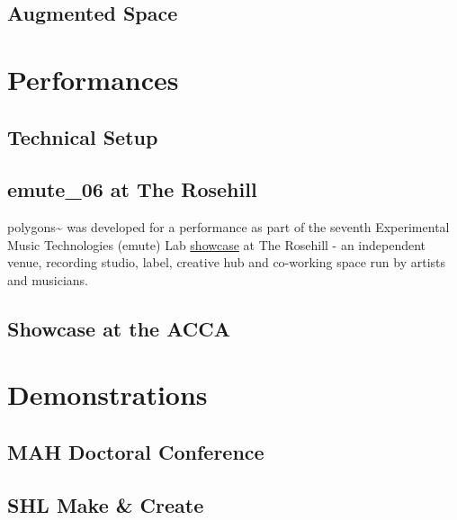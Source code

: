 \subsection{Augmented Space} \label{sec: polygons-composition-space}




\section{Performances} \label{sec: polygons-performances}
\subsection{Technical Setup} \label{sec: polygons-performances-setup}

\subsection{emute\_06 at The Rosehill} \label{sec: polygons-performances-rosehill}
polygons\textasciitilde{} was developed for a performance as part of the seventh Experimental Music Technologies (emute) Lab \href{http://www.emutelab.org/blog/emutelab6}{showcase} at The Rosehill - an independent venue, recording studio, label, creative hub and co-working space run by artists and musicians.

\subsection{Showcase at the ACCA} \label{sec: polygons-performances-acca}



\section{Demonstrations} \label{sec: polygons-demonstrations}
\subsection{MAH Doctoral Conference} \label{sec: polygons-demonstrations-mah}

\subsection{SHL Make \& Create} \label{sec: polygons-demonstrations-shl}

